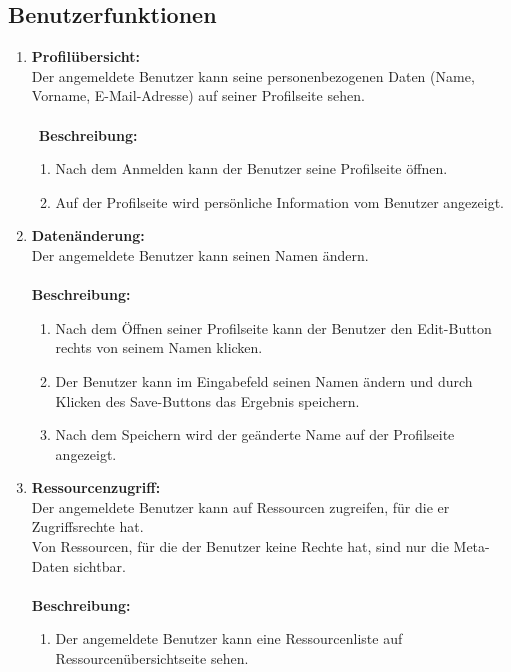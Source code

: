 \documentclass[parskip=full,11pt]{scrartcl}
\def\threedigits#1{%
  \ifnum#1<10 0\fi
  \ifnum#1<1 0\fi
  \number#1}
\begin{document}
\subsection{Benutzerfunktionen}
\begin{enumerate}[label={\textbf{/F\protect\threedigits{\theenumi}0/}}, leftmargin=*]
\item \label{FAB1} \textbf{Profilübersicht:} \\ Der angemeldete Benutzer kann seine personenbezogenen Daten (Name, Vorname, E-Mail-Adresse) auf seiner Profilseite sehen.\\\\\
\textbf{Beschreibung:}\\
\begin{enumerate}[label=(\arabic*), leftmargin=*]
\item Nach dem Anmelden kann der Benutzer seine Profilseite öffnen.
\item Auf der Profilseite wird persönliche Information vom Benutzer angezeigt.
\end{enumerate}
\item \label{FAB2} \textbf{Datenänderung:} \\ Der angemeldete Benutzer kann seinen Namen ändern.\\\\
\textbf{Beschreibung:}\\
\begin{enumerate}[label=(\arabic*), leftmargin=*]
\item Nach dem Öffnen seiner Profilseite kann der Benutzer den Edit-Button rechts von seinem Namen klicken.
\item Der Benutzer kann im Eingabefeld seinen Namen ändern und durch Klicken des Save-Buttons das Ergebnis speichern.
\item  Nach dem Speichern wird der geänderte Name auf der Profilseite angezeigt.
\end{enumerate}
\item \label{FAB3} \textbf{Ressourcenzugriff:} \\Der angemeldete Benutzer kann auf Ressourcen zugreifen, für die er Zugriffsrechte hat.
\\ Von Ressourcen, für die der Benutzer keine Rechte hat, sind nur die Meta-Daten sichtbar.\\\\
\textbf{Beschreibung:}\\
\begin{enumerate}[label=(\arabic*), leftmargin=*]
\item Der angemeldete Benutzer kann eine Ressourcenliste auf Ressourcenübersichtseite sehen.

\end{enumerate}
\end{enumerate}
\end{document}
